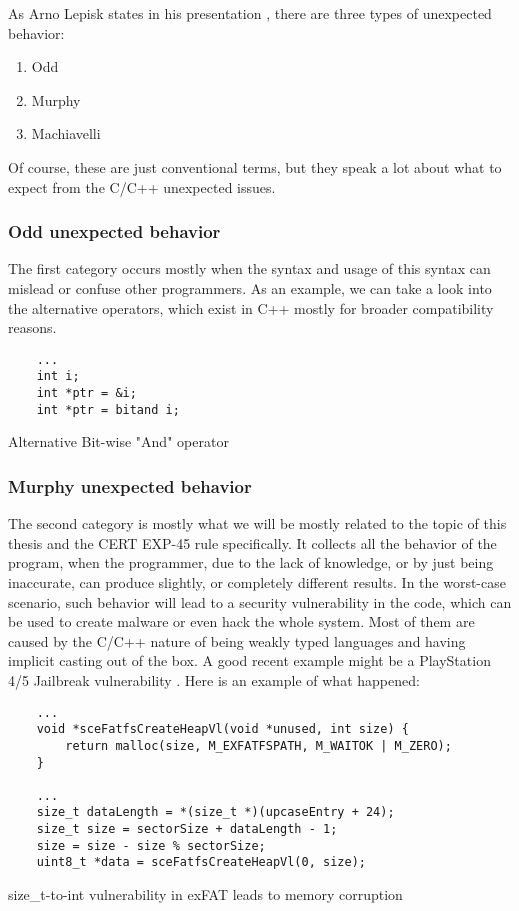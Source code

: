 As Arno Lepisk states in his presentation \cite{ppt-unexpected}, there are three types of unexpected behavior: 
 \begin{enumerate}[noitemsep]
  \item Odd
  \item Murphy
  \item Machiavelli
\end{enumerate}

Of course, these are just conventional terms, but they speak a lot about what to expect from the C/C++ unexpected issues. 

\subsubsection{Odd unexpected behavior}
The first category occurs mostly when the syntax and usage of this syntax can mislead or confuse other programmers. As an example, we can take a look into the alternative operators, which exist in C++ mostly for broader compatibility reasons.

\begin{listing}[h]
\begin{verbatim}
    ... 
    int i;
    int *ptr = &i;
    int *ptr = bitand i;
\end{verbatim}
\label{code:odd-bit-and-op}
\caption{Alternative Bit-wise "And" operator}
\end{listing}


\subsubsection{Murphy unexpected behavior}
The second category is mostly what we will be mostly related to the topic of this thesis and the CERT EXP-45 rule specifically. It collects all the behavior of the program, when the programmer, due to the lack of knowledge, or by just being inaccurate, can produce slightly, or completely different results. In the worst-case scenario, such behavior will lead to a security vulnerability in the code, which can be used to create malware or even hack the whole system. Most of them are caused by the C/C++ nature of being weakly typed languages and having implicit casting out of the box. A good recent example might be a PlayStation 4/5 Jailbreak vulnerability \cite{ps-vulnarability}. Here is an example of what happened:

\begin{listing}[h]
\begin{verbatim}
    ...
    void *sceFatfsCreateHeapVl(void *unused, int size) {
        return malloc(size, M_EXFATFSPATH, M_WAITOK | M_ZERO);
    }

    ... 
    size_t dataLength = *(size_t *)(upcaseEntry + 24);
    size_t size = sectorSize + dataLength - 1;
    size = size - size % sectorSize;
    uint8_t *data = sceFatfsCreateHeapVl(0, size);
\end{verbatim}
\caption{size\_t-to-int vulnerability in exFAT leads to memory corruption}
\label{code:murphy-ps5}
\end{listing}

